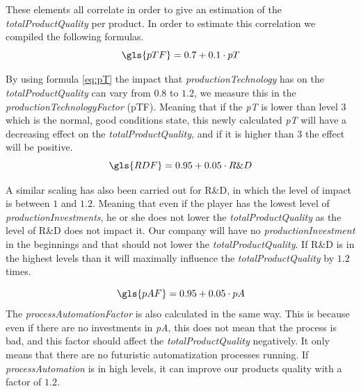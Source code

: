 These elements all correlate in order to give an estimation of the \textit{totalProductQuality} per product. In order to estimate this correlation we compiled the following formulas.
 \begin{equation}
\gls{pTF}=0.7+0.1 \cdot pT
 \label{eq:pT}
 \end{equation}
 
By using formula \ref{eq:pT} the impact that \textit{productionTechnology} has on the \textit{totalProductQuality} can vary from $0.8$ to $1.2$, we measure this in the \textit{productionTechnologyFactor} (pTF). Meaning that if the \textit{pT} is lower than level $3$ which is the normal, good conditions state, this newly calculated \textit{pT} will have a decreasing effect on the \textit{totalProductQuality}, and if it is higher than $3$ the effect will be positive.
\begin{equation}
\gls{RDF}= 0.95 + 0.05 \cdot R\&D
\label{eq:R\&D}
\end{equation}

A similar scaling has also been carried out for R\&D, in which the level of impact is between $1$ and $1.2$. Meaning that even if the player has the lowest level of \textit{productionInvestments}, he or she does not lower the \textit{totalProductQuality} as the level of R\&D does not impact it. Our company will have no \textit{productionInvestment} in the beginnings and that should not lower the \textit{totalProductQuality}. If R\&D is in the highest levels than it will maximally influence the \textit{totalProductQuality} by $1.2$ times.

\begin{equation}
\gls{pAF}= 0.95 + 0.05 \cdot pA
\label{eq:R\&D}
\end{equation}
The \textit{processAutomationFactor} is also calculated in the same way. This is because even if there are no investments in \textit{pA}, this does not mean that the process is bad, and this factor should affect the \textit{totalProductQuality} negatively. It only means that there are no futuristic automatization processes running. If \textit{processAutomation} is in high levels, it can improve our products quality with a factor of $1.2$. 

